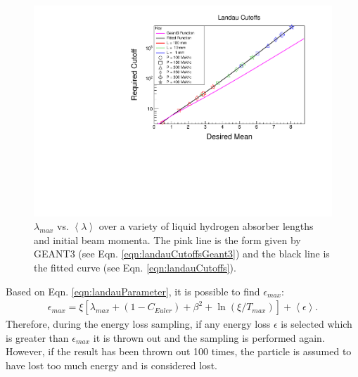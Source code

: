 \begin{figure}
  \centering
    \includegraphics[width=\textwidth]{Figures/landau_cutoffs} 
  \caption[$\lambda_{max}$ vs. $\left<\lambda\right>$ over a variety of liquid hydrogen absorber lengths and initial beam momenta.]{$\lambda_{max}$ vs. $\left<\lambda\right>$ over a variety of liquid hydrogen absorber lengths and initial beam momenta. The pink line is the form given by GEANT3 (see Eqn. \ref{eqn:landauCutoffsGeant3}) and the black line is the fitted curve (see Eqn. \ref{eqn:landauCutoffs}).}
  \label{fig:landau_cutoffs}
\end{figure}

Based on Eqn. \ref{eqn:landauParameter}, it is possible to find $\epsilon_{max}$:
\begin{align*}
\epsilon_{max}=\xi[\lambda_{max}+(1-C_{Euler})+\beta^2+\ln(\xi/T_{max})]+\left<\epsilon\right>.
\end{align*}
Therefore, during the energy loss sampling, if any energy loss $\epsilon$ is selected which is greater than $\epsilon_{max}$ it is thrown out and the sampling is performed again. However, if the result has been thrown out 100 times, the particle is assumed to have lost too much energy and is considered lost.

